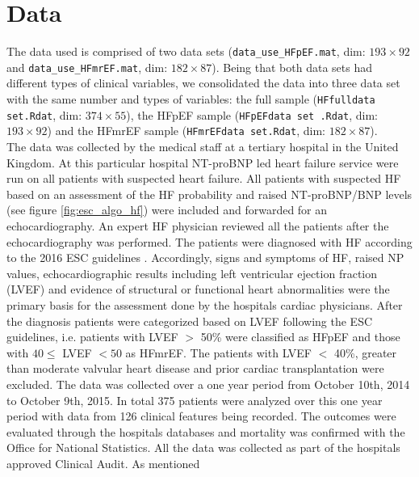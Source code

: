 \documentclass[../thesis.tex]{subfiles}
\begin{document}
\section{Data}
\label{sec:data}

\noindent The data used is comprised of two data sets (\texttt{data\_use\_HFpEF.mat}, dim: $193 \times 92$ and \texttt{data\_use\_HFmrEF.mat}, dim: $182 \times 87$). Being that both data sets had different types of clinical variables, we consolidated the data into three data set with the same number and types of variables: the full sample (\texttt{HFfulldata set.Rdat}, dim: $374 \times 55$), the HFpEF sample (\texttt{HFpEFdata set .Rdat}, dim: $193 \times 92$) and the HFmrEF sample (\texttt{HFmrEFdata set.Rdat}, dim: $182 \times 87$).\\
\indent The data was collected by the medical staff at a tertiary hospital in the United Kingdom. At this particular hospital NT-proBNP led heart failure service were run on all patients with suspected heart failure. All patients with suspected HF based on an assessment of the HF probability and raised NT-proBNP/BNP levels (see figure \ref{fig:esc_algo_hf}) were included and forwarded for an echocardiography. An expert HF physician reviewed all the patients after the echocardiography was performed. The patients were diagnosed with HF according to the 2016 ESC guidelines \citep{ponikowski2016}. Accordingly, signs and symptoms of HF, raised NP values, echocardiographic results including left ventricular ejection fraction (LVEF) and evidence of structural or functional heart abnormalities were the primary basis for the assessment done by the hospitals cardiac physicians. After the diagnosis patients were categorized based on LVEF following the ESC guidelines, i.e. patients with LVEF $>$ 50\% were classified as HFpEF and those with $40 \leq$ LVEF $< 50$ as HFmrEF. The patients with LVEF $<$ 40\%, greater than moderate valvular heart disease and prior cardiac transplantation were excluded. The data was collected over a one year period from October 10th, 2014 to October 9th, 2015. In total 375 patients were analyzed over this one year period with data from 126 clinical features being recorded. The outcomes were evaluated through the hospitals databases and mortality was confirmed with the Office for National Statistics. All the data was collected as part of the hospitals approved Clinical Audit. As mentioned



\newpage
\end{document}
